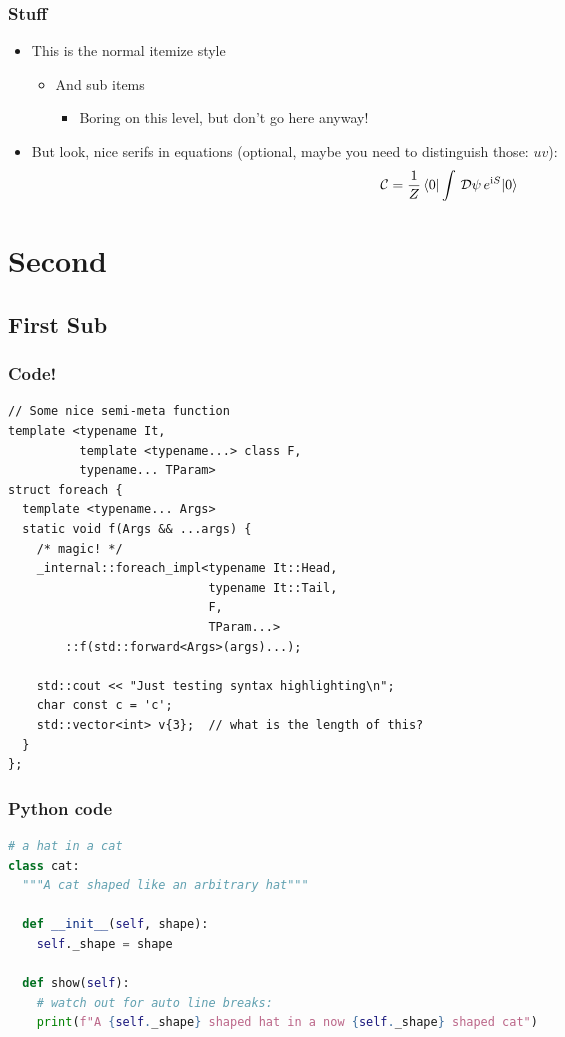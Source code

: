 \documentclass[mathserif, fleqn]{beamer}
\begin{document}
\begin{frame}\frametitle{Stuff}
  \begin{itemize}
  \item This is the normal itemize style
    \begin{itemize}
    \item And sub items
      \begin{itemize}
      \item Boring on this level, but don't go here anyway!
      \end{itemize}
    \end{itemize}

  \item But look, nice serifs in equations (optional, maybe you need to distinguish those: $uv$):
    \begin{align*}
      \mathcal{C} = \frac1{Z} \braket{0|\int\,\mathcal{D}\psi\,e^{\mathrm{i} S}|0}
    \end{align*}
  \end{itemize}
\end{frame}

\section{Second}
\subsection{First Sub}
\begin{frame}[fragile]\frametitle{Code!}
  \begin{lstlisting}[caption={A test C++ listing}]
// Some nice semi-meta function
template <typename It,
          template <typename...> class F,
          typename... TParam>
struct foreach {
  template <typename... Args>
  static void f(Args && ...args) {
    /* magic! */
    _internal::foreach_impl<typename It::Head,
                            typename It::Tail,
                            F,
                            TParam...>
        ::f(std::forward<Args>(args)...);

    std::cout << "Just testing syntax highlighting\n";
    char const c = 'c';
    std::vector<int> v{3};  // what is the length of this?
  }
};
  \end{lstlisting}
\end{frame}

\begin{frame}[fragile]\frametitle{{\dvfamily Python} code}
  \begin{lstlisting}[language=python, caption={Some Python as well}]
# a hat in a cat
class cat:
  """A cat shaped like an arbitrary hat"""

  def __init__(self, shape):
    self._shape = shape

  def show(self):
    # watch out for auto line breaks:
    print(f"A {self._shape} shaped hat in a now {self._shape} shaped cat")
  \end{lstlisting}
\end{frame}
\end{document}
